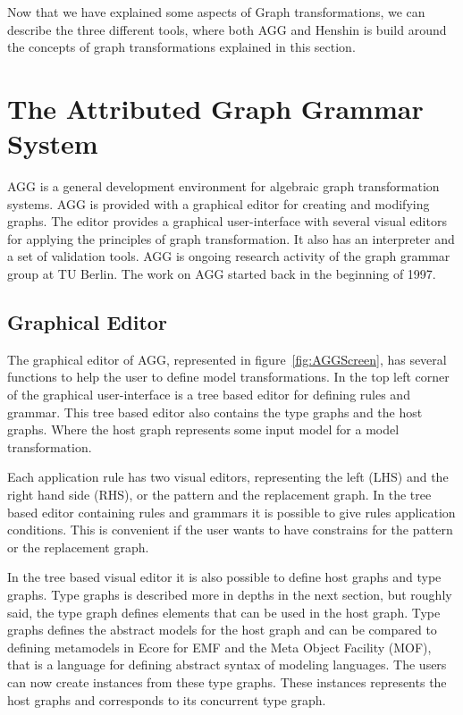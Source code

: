 \documentclass[pdftex,11pt,a4paper]{article}
\begin{document}
Now that we have explained some aspects of Graph transformations, we can
describe the three different tools, where both AGG and Henshin is build around
the concepts of graph transformations explained in this section. 

\section{The Attributed Graph Grammar System}

\noindent AGG is a general development environment for algebraic graph
transformation systems. AGG is provided with a graphical editor for creating
and modifying graphs. The editor provides a graphical user-interface with
several visual editors for applying the principles of graph transformation. It
also has an interpreter and a set of validation tools. AGG is ongoing research
activity of the graph grammar group at TU Berlin. The work on AGG started back
in the beginning of 1997.

\subsection{Graphical Editor}
\noindent The graphical editor of AGG, represented in
figure~\ref{fig:AGGScreen}, has several functions to help the user to define
model transformations. In the top left corner of the graphical user-interface
is a tree based editor for defining rules and grammar. This tree based editor
also contains the type graphs and the host graphs. Where the host graph
represents some input model for a model transformation.

Each application rule has two visual editors, representing the left
(LHS) and the right hand side (RHS), or the pattern and the replacement graph.
In the tree based editor containing rules and grammars it is possible to give
rules application conditions. This is convenient if the user wants to have
constrains for the pattern or the replacement graph.

In the tree based visual editor it is also possible to define host
graphs and type graphs. Type graphs is described more in depths in the next
section, but roughly said, the type graph defines elements that can be used in
the host graph. Type graphs defines the abstract models for the host graph and
can be compared to defining metamodels in Ecore for EMF and the Meta Object
Facility (MOF)\cite{MOF}, that is a language for defining abstract syntax of
modeling languages. The users can now create instances from these type graphs.
These instances represents the host graphs and corresponds to its concurrent
type graph.
\end{document}
